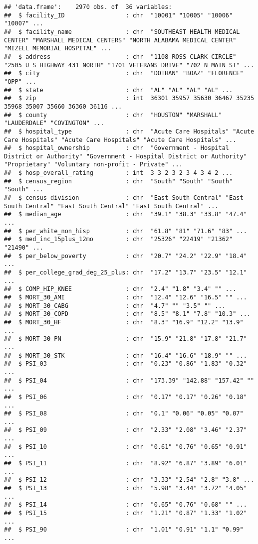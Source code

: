 \documentclass[
]{article}
\begin{document}
\begin{verbatim}
## 'data.frame':    2970 obs. of  36 variables:
##  $ facility_ID                 : chr  "10001" "10005" "10006" "10007" ...
##  $ facility_name               : chr  "SOUTHEAST HEALTH MEDICAL CENTER" "MARSHALL MEDICAL CENTERS" "NORTH ALABAMA MEDICAL CENTER" "MIZELL MEMORIAL HOSPITAL" ...
##  $ address                     : chr  "1108 ROSS CLARK CIRCLE" "2505 U S HIGHWAY 431 NORTH" "1701 VETERANS DRIVE" "702 N MAIN ST" ...
##  $ city                        : chr  "DOTHAN" "BOAZ" "FLORENCE" "OPP" ...
##  $ state                       : chr  "AL" "AL" "AL" "AL" ...
##  $ zip                         : int  36301 35957 35630 36467 35235 35968 35007 35660 36360 36116 ...
##  $ county                      : chr  "HOUSTON" "MARSHALL" "LAUDERDALE" "COVINGTON" ...
##  $ hospital_type               : chr  "Acute Care Hospitals" "Acute Care Hospitals" "Acute Care Hospitals" "Acute Care Hospitals" ...
##  $ hospital_ownership          : chr  "Government - Hospital District or Authority" "Government - Hospital District or Authority" "Proprietary" "Voluntary non-profit - Private" ...
##  $ hosp_overall_rating         : int  3 3 2 3 2 3 4 3 4 2 ...
##  $ census_region               : chr  "South" "South" "South" "South" ...
##  $ census_division             : chr  "East South Central" "East South Central" "East South Central" "East South Central" ...
##  $ median_age                  : chr  "39.1" "38.3" "33.8" "47.4" ...
##  $ per_white_non_hisp          : chr  "61.8" "81" "71.6" "83" ...
##  $ med_inc_15plus_12mo         : chr  "25326" "22419" "21362" "21490" ...
##  $ per_below_poverty           : chr  "20.7" "24.2" "22.9" "18.4" ...
##  $ per_college_grad_deg_25_plus: chr  "17.2" "13.7" "23.5" "12.1" ...
##  $ COMP_HIP_KNEE               : chr  "2.4" "1.8" "3.4" "" ...
##  $ MORT_30_AMI                 : chr  "12.4" "12.6" "16.5" "" ...
##  $ MORT_30_CABG                : chr  "4.7" "" "3.5" "" ...
##  $ MORT_30_COPD                : chr  "8.5" "8.1" "7.8" "10.3" ...
##  $ MORT_30_HF                  : chr  "8.3" "16.9" "12.2" "13.9" ...
##  $ MORT_30_PN                  : chr  "15.9" "21.8" "17.8" "21.7" ...
##  $ MORT_30_STK                 : chr  "16.4" "16.6" "18.9" "" ...
##  $ PSI_03                      : chr  "0.23" "0.86" "1.83" "0.32" ...
##  $ PSI_04                      : chr  "173.39" "142.88" "157.42" "" ...
##  $ PSI_06                      : chr  "0.17" "0.17" "0.26" "0.18" ...
##  $ PSI_08                      : chr  "0.1" "0.06" "0.05" "0.07" ...
##  $ PSI_09                      : chr  "2.33" "2.08" "3.46" "2.37" ...
##  $ PSI_10                      : chr  "0.61" "0.76" "0.65" "0.91" ...
##  $ PSI_11                      : chr  "8.92" "6.87" "3.89" "6.01" ...
##  $ PSI_12                      : chr  "3.33" "2.54" "2.8" "3.8" ...
##  $ PSI_13                      : chr  "5.98" "3.44" "3.72" "4.05" ...
##  $ PSI_14                      : chr  "0.65" "0.76" "0.68" "" ...
##  $ PSI_15                      : chr  "1.21" "0.87" "1.33" "1.02" ...
##  $ PSI_90                      : chr  "1.01" "0.91" "1.1" "0.99" ...
\end{verbatim}
\end{document}
